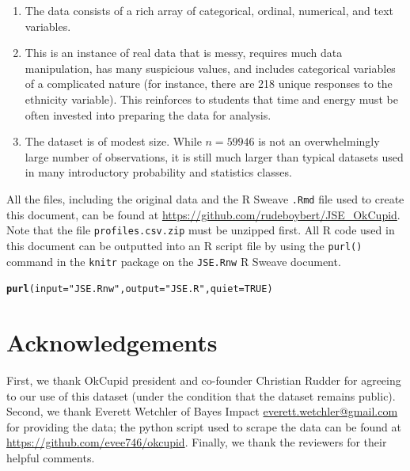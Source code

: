 \documentclass{article}\usepackage[]{graphicx}\usepackage[]{color}
\makeatletter
\newcommand{\hlnum}[1]{\textcolor[rgb]{0.686,0.059,0.569}{#1}}%
\newcommand{\hlstr}[1]{\textcolor[rgb]{0.192,0.494,0.8}{#1}}%
\newcommand{\hlstd}[1]{\textcolor[rgb]{0.345,0.345,0.345}{#1}}%
\newcommand{\hlkwc}[1]{\textcolor[rgb]{0.333,0.667,0.333}{#1}}%
\newcommand{\hlkwd}[1]{\textcolor[rgb]{0.737,0.353,0.396}{\textbf{#1}}}%
\newenvironment{kframe}{%
 \def\at@end@of@kframe{}%
 \ifinner\ifhmode%
  \def\at@end@of@kframe{\end{minipage}}%
  \begin{minipage}{\columnwidth}%
 \fi\fi%
 \def\FrameCommand##1{\hskip\@totalleftmargin \hskip-\fboxsep
 \colorbox{shadecolor}{##1}\hskip-\fboxsep
     \hskip-\linewidth \hskip-\@totalleftmargin \hskip\columnwidth}%
 \MakeFramed {\advance\hsize-\width
   \@totalleftmargin\z@ \linewidth\hsize
   \@setminipage}}%
 {\par\unskip\endMakeFramed%
 \at@end@of@kframe}
\newenvironment{knitrout}{}{} %
\makeatother
\begin{document}
\begin{enumerate}
\item The data consists of a rich array of categorical, ordinal, numerical, and text variables.
\item This is an instance of real data that is messy, requires much data manipulation, has many suspicious values, and includes categorical variables of a complicated nature (for instance, there are 218 unique responses to the ethnicity variable).  This reinforces to students that time and energy must be often invested into preparing the data for analysis.
\item The dataset is of modest size.  While $n = 59946$ is not an overwhelmingly large number of observations, it is still much larger than typical datasets used in many introductory probability and statistics classes.
\end{enumerate}

All the files, including the original data and the R Sweave \verb#.Rmd# file used to create this document, can be found at \url{https://github.com/rudeboybert/JSE_OkCupid}.  Note that the file \verb#profiles.csv.zip# must be unzipped first.  All R code used in this document can be outputted into an R script file by using the \verb#purl()# command in the \verb#knitr# package on the \verb#JSE.Rnw# R Sweave document.
\begin{knitrout}
\color{fgcolor}\begin{kframe}
\begin{alltt}
\hlkwd{purl}\hlstd{(}\hlkwc{input}\hlstd{=}\hlstr{"JSE.Rnw"}\hlstd{,} \hlkwc{output}\hlstd{=}\hlstr{"JSE.R"}\hlstd{,} \hlkwc{quiet}\hlstd{=}\hlnum{TRUE}\hlstd{)}
\end{alltt}
\end{kframe}
\end{knitrout}










%
\section{Acknowledgements}\label{ack}
%
First, we thank OkCupid president and co-founder Christian Rudder for agreeing to our use of this dataset (under the condition that the dataset remains public).  Second, we thank Everett Wetchler of Bayes Impact \url{everett.wetchler@gmail.com} for providing the data; the python script used to scrape the data can be found at \url{https://github.com/evee746/okcupid}.  Finally, we thank the reviewers for their helpful comments.
\end{document}

